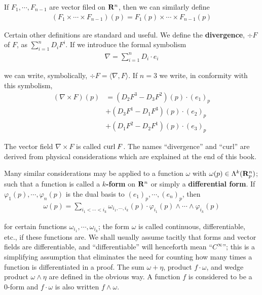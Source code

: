 If $F_1,\cdots,F_{n-1}$ are vector filed on $\mathbf{R}^n$, then we can 
similarly define 
\begin{align*}
    (F_1\times\cdots\times F_{n-1})(p) = F_1(p)\times\cdots\times F_{n-1}(p)
\end{align*}

Certain other definitions are standard and useful. We define the \textbf{divergence}, 
$\div F$ of $F$, as $\sum_{i=1}^{n}{D_iF^i}$. If we introduce the formal symbolism
\begin{align*}
    \nabla = \sum_{i=1}^{n}{D_i\cdot e_i}
\end{align*}

we can write, symbolically, $\div F = \langle \nabla, F\rangle$. If $n=3$
we write, in conformity with this symbolism,
\begin{align*}
    (\nabla\times F)(p) 
    & = (D_2F^3 - D_3F^2)(p)\cdot (e_1)_p \\
    & + (D_3F^1 - D_1F^3)(p)\cdot (e_2)_p \\
    & + (D_1F^2 - D_2F^1)(p)\cdot (e_3)_p
\end{align*}

The vector field $\nabla\times F$ is called $\mathrm{curl}\; F$.
The names ``divergence'' and ``curl'' are derived from physical considerations
which are explained at the end of this book. 

Many similar considerations may be applied to a function $\omega$ with 
$\omega(p)\in \Lambda^k(\mathbf{R}^n_p)$; such that a function is called a 
$k$\textbf{-form} on $\mathbf{R}^n$ or simply a \textbf{differential form}.
If $\varphi_1(p),\cdots,\varphi_n(p)$ is the dual basis to $(e_1)_p,\cdots,(e_n)_p$, then 
\begin{align*}
    \omega(p) = \sum_{i_1<\cdots<i_k}{\omega_{i_1,\cdots,i_k}(p)\cdot \varphi_{i_1}(p)\wedge\cdots\wedge\varphi_{i_k}(p)}
\end{align*}

for certain functions $\omega_{i_1},\cdots,\omega_{i_k}$; the form $\omega$ 
is called continuous, differentiable, etc., if these functions are.
We shall usually assume tacitly that forms and vector fields are differentiable,
and ``differentiable'' will henceforth mean ``$C^\infty$''; this is a
simplifying assumption that eliminates the need for counting
how many times a function is differentiated in a proof.
The sum $\omega+\eta$, product $f \cdot \omega$, and wedge product 
$\omega\wedge\eta$ are defined in the obvious way. A function $f$ is 
considered to be a 0-form and $f\cdot \omega$ is also written $f\wedge\omega$.

